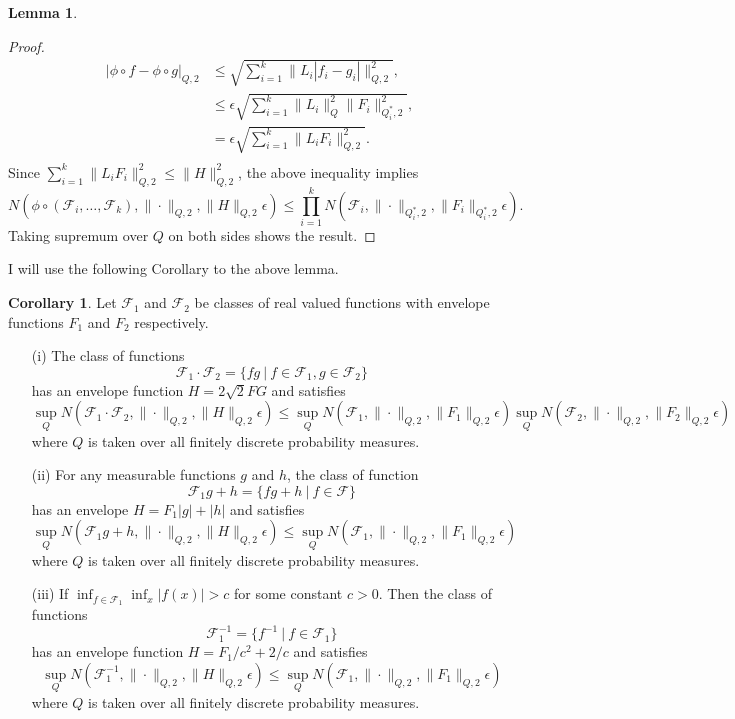 \documentclass[12pt,oneside,reqno,english]{amsart}
\theoremstyle{definition}
\newtheorem{corollary}{Corollary}
\newtheorem{lemma}{Lemma}
\begin{document}
\begin{lemma}
\begin{proof}
\begin{align*}
|\phi\circ f-\phi\circ g |_{Q,2}&\leq \sqrt{\sum_{i=1}^{k}\|L_{i}|f_{i}-g_{i}|\|_{Q,2}^{2}},\\
&\leq  \epsilon\sqrt{\sum_{i=1}^{k}\|L_{i}\|_{Q}^{2}\|F_{i}\|_{Q^{*}_{i},2}^{2}},\\
&=  \epsilon \sqrt{\sum_{i=1}^{k} \|L_{i}F_{i}\|_{Q,2}^{2}}.\\
\end{align*}
Since $\sum_{i=1}^{k} \|L_{i}F_{i}\|_{Q,2}^{2}\leq \|H\|_{Q,2}^{2}$, the above inequality implies 
\[N(\phi\circ (\mathcal{F}_{i},\ldots,\mathcal{F}_{k}),\|\cdot\|_{Q,2},\|H\|_{Q,2}\epsilon)\leq \prod_{i=1}^{k}N(\mathcal{F}_{i},\| \cdot \|_{Q^{*}_{i},2},\|F_{i}\|_{Q^{*}_{i},2}\epsilon).\]
Taking supremum over $Q$ on both sides shows the result. 
\end{proof}
\end{lemma}
I will use the following Corollary to the above lemma.  
\begin{corollary}\label{c:entropy}
Let $\mathcal{F}_{1}$ and $\mathcal{F}_{2}$ be classes of real valued functions with envelope functions $F_{1}$ and $F_{2}$ respectively.
\begin{itemize}
\item[{(i)}]  The class of functions 
\[\mathcal{F}_{1}\cdot\mathcal{F}_{2}=\{fg\ | \ f\in \mathcal{F}_{1}, g\in \mathcal{F}_{2}\} \]
has an envelope function $H=2\sqrt{2}FG$ and satisfies
\[\sup_{Q}N(\mathcal{F}_{1}\cdot\mathcal{F}_{2},\|\cdot\|_{Q,2},\|H\|_{Q,2}\epsilon)\leq 
\sup_{Q}N(\mathcal{F}_{1},\|\cdot\|_{Q,2},\|F_{1}\|_{Q,2}\epsilon)\sup_{Q}N(\mathcal{F}_{2},\|\cdot\|_{Q,2},\|F_{2}\|_{Q,2}\epsilon)\]
where $Q$ is taken over all finitely discrete probability measures.
\item[{(ii)}] For any measurable functions $g$ and $h$,
 the class of function 
 \[\mathcal{F}_{1}g+h=\{fg+h\ | \ f\in \mathcal{F}\} \]
has an envelope $H=F_{1}|g|+|h|$ and satisfies
\[\sup_{Q}N(\mathcal{F}_{1}g+h,\|\cdot\|_{Q,2},\|H\|_{Q,2}\epsilon)\leq 
\sup_{Q}N(\mathcal{F}_{1},\|\cdot\|_{Q,2},\|F_{1}\|_{Q,2}\epsilon)\]
where $Q$ is taken over all finitely discrete probability measures.
\item[{(iii)}] If $\inf_{f\in \mathcal{F}_{1}}\inf_{x}|f(x)|>c$ for some constant $c>0$.
 Then the class of functions  
\[\mathcal{F}_{1}^{-1}=\{f^{-1}\ | \ f\in \mathcal{F}_{1}\}\]
has an envelope function $H=F_{1}/c^{2}+2/c$ and satisfies
\[\sup_{Q}N(\mathcal{F}_{1}^{-1},\|\cdot\|_{Q,2},\|H\|_{Q,2}\epsilon)\leq 
\sup_{Q}N(\mathcal{F}_{1},\|\cdot\|_{Q,2},\|F_{1}\|_{Q,2}\epsilon)\]
where $Q$  is taken over all finitely discrete probability measures.
\end{itemize}
\end{corollary}
\end{document}
